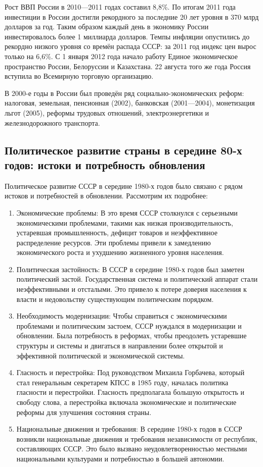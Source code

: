 \documentclass{article}
\begin{document}
\hfill

Рост ВВП России в 2010—2011 годах составил 8,8\%. По итогам 2011 года инвестиции в России достигли рекордного за последние 20 лет уровня в 370 млрд долларов за год. Таким образом каждый день в экономику России инвестировалось более 1 миллиарда долларов. Темпы инфляции опустились до рекордно низкого уровня со времён распада СССР: за 2011 год индекс цен вырос только на 6,6\%. С 1 января 2012 года начало работу Единое экономическое пространство России, Белоруссии и Казахстана. 22 августа того же года Россия вступила во Всемирную торговую организацию.

\hfill

В 2000-е годы в России был проведён ряд социально-экономических реформ: налоговая, земельная, пенсионная (2002), банковская (2001—2004), монетизация льгот (2005), реформы трудовых отношений, электроэнергетики и железнодорожного транспорта.

\pagebreak
\subsection{Политическое развитие страны в середине 80-х годов: истоки и потребность обновления}

Политическое развитие СССР в середине 1980-х годов было связано с рядом истоков и потребностей в обновлении. Рассмотрим их подробнее:

\begin{enumerate}
    \item Экономические проблемы: В это время СССР столкнулся с серьезными экономическими проблемами, такими как низкая производительность, устаревшая промышленность, дефицит товаров и неэффективное распределение ресурсов. Эти проблемы привели к замедлению экономического роста и ухудшению жизненного уровня населения.
    \item Политическая застойность: В СССР в середине 1980-х годов был заметен политический застой. Государственная система и политический аппарат стали неэффективными и отсталыми. Это привело к потере доверия населения к власти и недовольству существующим политическим порядком.
    \item Необходимость модернизации: Чтобы справиться с экономическими проблемами и политическим застоем, СССР нуждался в модернизации и обновлении. Была потребность в реформах, чтобы преодолеть устаревшие структуры и системы и двигаться в направлении более открытой и эффективной политической и экономической системы.
    \item Гласность и перестройка: Под руководством Михаила Горбачева, который стал генеральным секретарем КПСС в 1985 году, началась политика гласности и перестройки. Гласность предполагала большую открытость и свободу слова, а перестройка включала экономические и политические реформы для улучшения состояния страны.
    \item Национальные движения и требования: В середине 1980-х годов в СССР возникли национальные движения и требования независимости от республик, составляющих СССР. Это было вызвано неудовлетворенностью местными национальными культурами и потребностью в большей автономии.
\end{enumerate}
\end{document}

